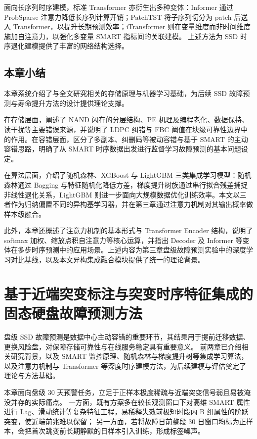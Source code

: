面向长序列时序建模，标准 Transformer 亦衍生出多种变体：Informer 通过 ProbSparse 注意力降低长序列计算开销；PatchTST 将子序列切分为 patch 后送入 Transformer，以提升长期预测效率\cite{nie2023timeseriesworth64}；iTransformer 则在变量维度而非时间维度施加自注意力，以强化多变量 SMART 指标间的关联建模\cite{liu2023itransformer}。
上述方法为 SSD 时序退化建模提供了丰富的网络结构选择。

\section{本章小结}

本章系统介绍了与全文研究相关的存储原理与机器学习基础，为后续 SSD 故障预测与寿命提升方法的设计提供理论支撑。

在存储层面，阐述了 NAND 闪存的分层结构、PE 机理及编程老化、数据保持、读干扰等主要错误来源，并说明了 LDPC 纠错与 FBC 阈值在块级可靠性边界中的作用。在容错层面，区分了多副本、纠删码等被动容错与基于 SMART 的主动容错思路，明确了从 SMART 时序数据出发进行监督学习故障预测的基本问题设定。

在算法层面，介绍了随机森林、XGBoost 与 LightGBM 三类集成学习模型：随机森林通过 Bagging 与特征随机化降低方差，梯度提升树族通过串行拟合残差捕捉非线性退化关系，LightGBM 则进一步面向大规模数据优化训练效率。本文以三者作为归纳偏置不同的异构基学习器，并在第三章通过注意力机制对其输出概率做样本级融合。

此外，本章还概述了注意力机制的基本形式与 Transformer Encoder 结构，说明了 softmax 加权、缩放点积自注意力等核心运算，并指出 Decoder 及 Informer 等变体在多步时序预测中的应用场景。上述内容为第三章盘级故障预测实验中的深度学习对比基线，以及本文异构集成融合模块提供了统一的理论背景。

\chapter{基于近端突变标注与突变时序特征集成的固态硬盘故障预测方法}
\label{chap:ssd-fail-pred}

盘级 SSD 故障预测是数据中心主动容错的重要环节，其结果用于提前迁移数据、更换风险盘，对保障存储可靠性与在线服务稳定具有重要意义。
前两章已介绍相关研究背景，以及 SMART 监控原理、随机森林与梯度提升树等集成学习算法，以及注意力机制与 Transformer 等深度时序建模方法，为后续建模与评估奠定了理论与方法基础。

本章面向盘级 30 天预警任务，立足于正样本极度稀疏与近端突变信号弱且易被淹没并存的实际痛点。
一方面，既有方案多在较长观测窗口下对高维 SMART 属性进行 Lag、滑动统计等复杂特征工程\cite{xu2021general,wang2022ssd,zhang2023multi}，易稀释失效前极短时段内 B 组属性的阶跃突变，使近端前兆难以保留；
另一方面，若将故障日前整段 30 日窗口均标为正样本，会把首次跳变前长期静默的日样本引入训练，形成标签噪声。

